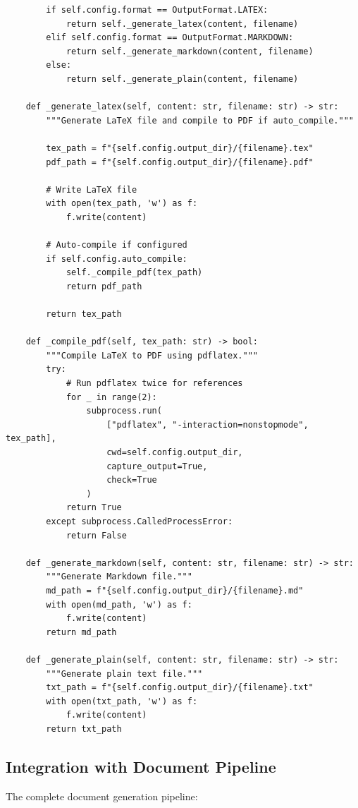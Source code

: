 \begin{verbatim}
        if self.config.format == OutputFormat.LATEX:
            return self._generate_latex(content, filename)
        elif self.config.format == OutputFormat.MARKDOWN:
            return self._generate_markdown(content, filename)
        else:
            return self._generate_plain(content, filename)

    def _generate_latex(self, content: str, filename: str) -> str:
        """Generate LaTeX file and compile to PDF if auto_compile."""

        tex_path = f"{self.config.output_dir}/{filename}.tex"
        pdf_path = f"{self.config.output_dir}/{filename}.pdf"

        # Write LaTeX file
        with open(tex_path, 'w') as f:
            f.write(content)

        # Auto-compile if configured
        if self.config.auto_compile:
            self._compile_pdf(tex_path)
            return pdf_path

        return tex_path

    def _compile_pdf(self, tex_path: str) -> bool:
        """Compile LaTeX to PDF using pdflatex."""
        try:
            # Run pdflatex twice for references
            for _ in range(2):
                subprocess.run(
                    ["pdflatex", "-interaction=nonstopmode", tex_path],
                    cwd=self.config.output_dir,
                    capture_output=True,
                    check=True
                )
            return True
        except subprocess.CalledProcessError:
            return False

    def _generate_markdown(self, content: str, filename: str) -> str:
        """Generate Markdown file."""
        md_path = f"{self.config.output_dir}/{filename}.md"
        with open(md_path, 'w') as f:
            f.write(content)
        return md_path

    def _generate_plain(self, content: str, filename: str) -> str:
        """Generate plain text file."""
        txt_path = f"{self.config.output_dir}/{filename}.txt"
        with open(txt_path, 'w') as f:
            f.write(content)
        return txt_path
\end{verbatim}

\subsection{Integration with Document Pipeline}

The complete document generation pipeline:


